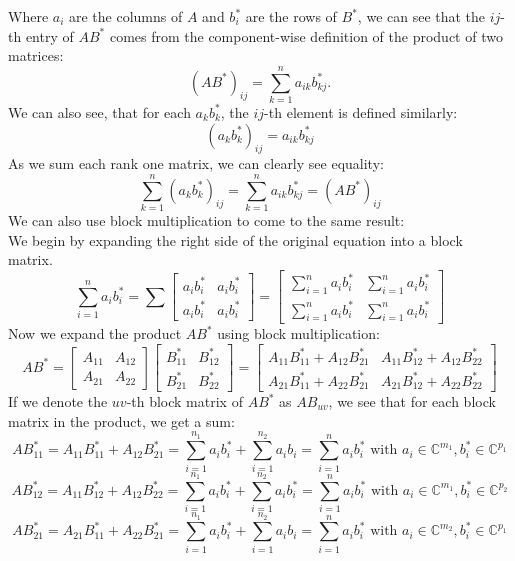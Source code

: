 \documentclass[12pt]{article}
\numberwithin{equation}{section}
\begin{document}
\begin{enumerate}
    Where $a_i$ are the columns of $A$ and $b_i^*$ are the rows of $B^*$, we can see that the $ij$-th entry of $AB^*$ comes from the component-wise definition of the product of two matrices:
    $$(AB^*)_{ij}=\sum_{k=1}^n a_{ik}b^*_{kj}.$$
    We can also see, that for each $a_kb^*_k$, the $ij$-th element is defined similarly:
    $$(a_kb_k^*)_{ij}=a_{ik}b^*_{kj}$$
    As we sum each rank one matrix, we can clearly see equality:
    $$\sum_{k=1}^n(a_kb_k^*)_{ij}=\sum_{k=1}^n a_{ik}b^*_{kj}=(AB^*)_{ij}$$
    We can also use block multiplication to come to the same result:\\
    We begin by expanding the right side of the original equation into a block matrix.
    $$\sum_{i=1}^n a_ib_i^*=\sum\left[\begin{array}{c|c} a_ib_i^* & a_ib_i^*\\ \hline a_ib_i^*&a_ib_i^*\end{array}\right]=\left[\begin{array}{c|c}\sum_{i=1}^n a_ib_i^* &\sum_{i=1}^n a_ib_i^*\\ \hline \sum_{i=1}^n a_ib_i^* &\sum_{i=1}^n a_ib_i^*\end{array}\right]$$
    Now we expand the product $AB^*$ using block multiplication:
    $$AB^*=\left[\begin{array}{c|c}A_{11}& A_{12}\\ \hline A_{21} & A_{22}\end{array}\right]
    \left[\begin{array}{c|c}B_{11}^* & B_{12}^*\\ \hline B_{21}^* & B_{22}^*\end{array}\right]=
    \left[\begin{array}{c|c} A_{11}B_{11}^*+A_{12}B_{21}^* & A_{11}B_{12}^* +A_{12}B_{22}^*\\ \hline A_{21}B_{11}^*+A_{22}B_{21}^* & A_{21}B_{12}^*+A_{22}B_{22}^*\end{array}\right]$$
    If we denote the $uv$-th block matrix of $AB^*$ as $AB_{uv}$, we see that for each block matrix in the product, we get a sum:
    $$AB^*_{11}=A_{11}B_{11}^*+A_{12}B_{21}^*=\sum_{i=1}^{n_1}a_ib_i^*+\sum_{i=1}^{n_2}a_ib_i=\sum_{i=1}^n a_ib_i^*\text{ with }a_i\in \mathbb{C}^{m_1},b^*_i\in \mathbb{C}^{p_1}$$
    $$AB^*_{12}=A_{11}B_{12}^*+A_{12}B_{22}^*=\sum_{i=1}^{n_1}a_ib_i^*+\sum_{i=1}^{n_2}a_ib_i^*=\sum_{i=1}^na_ib_i^*\text{ with }a_i\in \mathbb{C}^{m_1},b^*_i\in \mathbb{C}^{p_2}$$
    $$AB^*_{21}=A_{21}B_{11}^*+A_{22}B_{21}^*=\sum_{i=1}^{n_1}a_ib_i^*+\sum_{i=1}^{n_2}a_ib_i=\sum_{i=1}^n a_ib_i^*\text{ with }a_i\in \mathbb{C}^{m_2},b^*_i\in \mathbb{C}^{p_1}$$

\end{enumerate}
\end{document}

